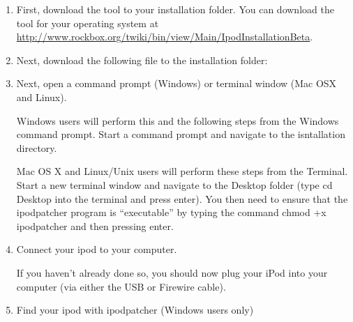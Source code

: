 \begin{enumerate} 

  \item First, download the  tool to your installation 
  folder.  You can download the  tool for your operating 
  system at 
  \url{http://www.rockbox.org/twiki/bin/view/Main/IpodInstallationBeta}.
  
  \item Next, download the following file to the installation folder: 


  \item Next, open a command prompt (Windows) or terminal window (Mac OSX and Linux).
  
    Windows users will perform this and the following steps from the Windows 
    command prompt. Start a command prompt and navigate to the isntallation 
    directory.

    Mac OS X and Linux/Unix users will perform these steps from the Terminal. 
    Start a new terminal window and navigate to the Desktop folder (type cd 
    Desktop into the terminal and press enter). You then need to ensure that the 
    ipodpatcher program is ``executable'' by typing the command chmod +x 
    ipodpatcher and then pressing enter.
  
  \item Connect your ipod to your computer.

		If you haven't already done so, you should now plug your iPod into your 
		computer (via either the USB or Firewire cable).


	\item Find your ipod with ipodpatcher (Windows users only)


\end{enumerate}
